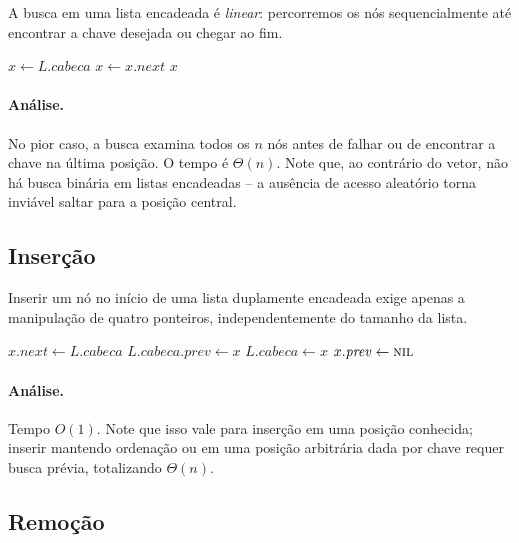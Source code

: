\documentclass[9pt,a4paper]{extarticle}
\newcommand{\impt}[1]{\textcolor{important}{#1}}
\newcommand{\ntc}[1]{\textcolor{notice}{#1}}
\theoremstyle{definition}
\begin{document}
A busca em uma lista encadeada é \emph{linear}: percorremos os nós sequencialmente até encontrar a chave desejada ou chegar ao fim.

\begin{algorithm}[H]
\caption{\textsc{Lista-Busca}($L, k$)}
\begin{algorithmic}[1]
\State $x \gets L.\mathit{cabeca}$
    \State $x \gets x.\mathit{next}$
\EndWhile
\State \Return $x$
\end{algorithmic}
\end{algorithm}

\paragraph{Análise.} No pior caso, a busca examina todos os $n$ nós antes de falhar ou de encontrar a chave na última posição. O tempo é \impt{$\Theta(n)$}. Note que, ao contrário do vetor, \ntc{não há busca binária em listas encadeadas} -- a ausência de acesso aleatório torna inviável saltar para a posição central.

\subsection{Inserção}

Inserir um nó no início de uma lista duplamente encadeada exige apenas a manipulação de quatro ponteiros, independentemente do tamanho da lista.

\begin{algorithm}[H]
\caption{\textsc{Lista-Insere}($L, x$) -- insere $x$ no início de $L$}
\begin{algorithmic}[1]
\State $x.\mathit{next} \gets L.\mathit{cabeca}$
    \State $L.\mathit{cabeca}.\mathit{prev} \gets x$
\EndIf
\State $L.\mathit{cabeca} \gets x$
\State $x.\mathit{prev} \gets \textsc{nil}$
\end{algorithmic}
\end{algorithm}

\paragraph{Análise.} \impt{Tempo $O(1)$}. Note que isso vale para inserção em uma \ntc{posição conhecida}; inserir mantendo ordenação ou em uma posição arbitrária dada por chave requer busca prévia, totalizando $\Theta(n)$.

\subsection{Remoção}
\end{document}
